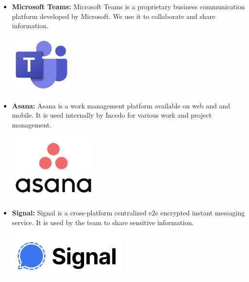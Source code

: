 \begin{itemize}
          \newpage
    \item \textbf{Microsoft Teams:} \newline Microsoft Teams is a proprietary business communication platform developed by Microsoft. We use it to collaborate and share information. \newline
          \begin{minipage}{\linewidth}
              \centering
              \includegraphics[width=3.2cm]{src/assets/logos/ms-teams-logo.png}
          \end{minipage}
    \item \textbf{Asana:} \newline Asana is a work management platform available on web and and mobile. It is used internally by Incedo for various work and project management. \newline
          \begin{minipage}{\linewidth}
              \centering
              \includegraphics[width=4.5cm]{src/assets/logos/asana-logo.png}
          \end{minipage}
    \item \textbf{Signal:} \newline Signal is a cross-platform centralized e2e encrypted instant messaging service. It is used by the team to share sensitive information. \newline
          \begin{minipage}{\linewidth}
              \centering
              \includegraphics[width=6cm]{src/assets/logos/signal-logo.png}
          \end{minipage}

          \newpage
\end{itemize}

